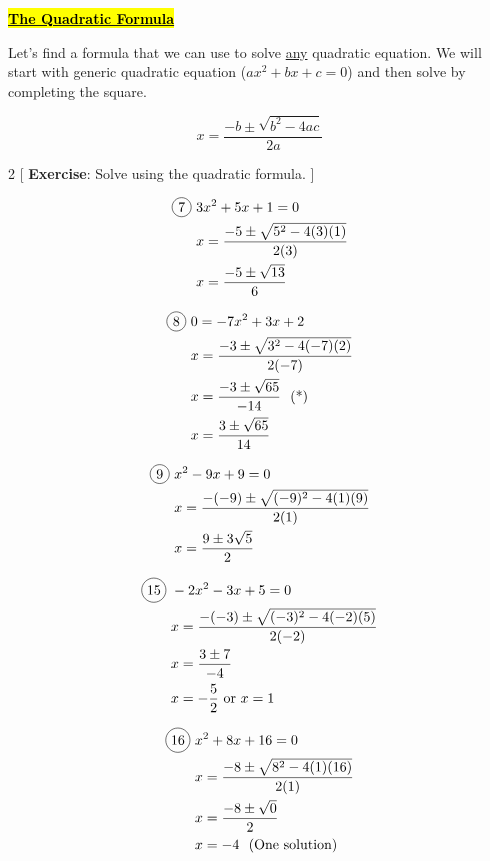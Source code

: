 \centerline{\underline{\textbf{\large \hl{The Quadratic Formula}}}}

\vspace{.4cm}

Let's find a formula that we can use to solve \underline{any} quadratic equation. We will start with generic quadratic equation ($ax^{2}+bx+c=0$) and then solve by completing the square.

\begin{tcolorbox}[colback=red!5!white,colframe=red!75!black]
  \[x=\frac{-b\pm \sqrt{b^{2}-4ac}}{2a}\]
\end{tcolorbox}

\vspace{.5cm}

\begin{multicols}{2}
[
  \textbf{Exercise}: Solve using the quadratic formula.
]

\begin{align*}
  \circled{7}\ &3x^{2}+5x+1=0\\
  &x=\frac{-5\pm\sqrt{5^{2}-4(3)(1)}}{2(3)}\\
  &x=\frac{-5\pm\sqrt{13}}{6}
\end{align*}

\begin{align*}
  \circled{8}\ &0=-7x^{2}+3x+2\\
  &x=\frac{-3\pm\sqrt{3^{2}-4(-7)(2)}}{2(-7)}\\
  &x=\frac{-3\pm\sqrt{65}}{-14}\ \text{ (*)}\\
  &x=\frac{3\pm\sqrt{65}}{14}
\end{align*}

\begin{align*}
  \circled{9}\ &x^{2}-9x+9=0\\
  &x=\frac{-(-9)\pm\sqrt{(-9)^{2}-4(1)(9)}}{2(1)}\\
  &x=\frac{9\pm 3\sqrt{5}}{2}\\
\end{align*}

\begin{align*}
  \circled{15}\ &-2x^{2}-3x+5=0\\
  &x=\frac{-(-3)\pm\sqrt{(-3)^{2}-4(-2)(5)}}{2(-2)}\\
  &x=\frac{3\pm 7}{-4}\\
  &x=-\frac{5}{2} \text{ or } x=1
\end{align*}

\begin{align*}
  \circled{16}\ &x^{2}+8x+16=0\\
  &x=\frac{-8\pm\sqrt{8^{2}-4(1)(16)}}{2(1)}\\
  &x=\frac{-8\pm \sqrt{0}}{2}\\
  &x=-4\ \text{ (One solution)}
\end{align*}


\end{multicols}
